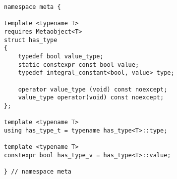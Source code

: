 
\begin{verbatim}
namespace meta {

template <typename T>
requires Metaobject<T>
struct has_type
{
	typedef bool value_type;
	static constexpr const bool value;
	typedef integral_constant<bool, value> type;

	operator value_type (void) const noexcept;
	value_type operator(void) const noexcept;
};

template <typename T>
using has_type_t = typename has_type<T>::type;

template <typename T>
constexpr bool has_type_v = has_type<T>::value;

} // namespace meta
\end{verbatim}
